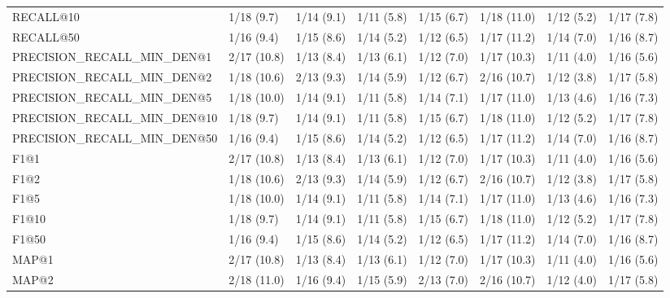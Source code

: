 \begin{tabular}{llllllll}
RECALL@10                   &      1/18 (9.7) &       1/14 (9.1) &  1/11 (5.8) &  1/15 (6.7) &  1/18 (11.0) &     1/12 (5.2) &            1/17 (7.8) \\
RECALL@50                   &      1/16 (9.4) &       1/15 (8.6) &  1/14 (5.2) &  1/12 (6.5) &  1/17 (11.2) &     1/14 (7.0) &            1/16 (8.7) \\
PRECISION_RECALL_MIN_DEN@1  &     2/17 (10.8) &       1/13 (8.4) &  1/13 (6.1) &  1/12 (7.0) &  1/17 (10.3) &     1/11 (4.0) &            1/16 (5.6) \\
PRECISION_RECALL_MIN_DEN@2  &     1/18 (10.6) &       2/13 (9.3) &  1/14 (5.9) &  1/12 (6.7) &  2/16 (10.7) &     1/12 (3.8) &            1/17 (5.8) \\
PRECISION_RECALL_MIN_DEN@5  &     1/18 (10.0) &       1/14 (9.1) &  1/11 (5.8) &  1/14 (7.1) &  1/17 (11.0) &     1/13 (4.6) &            1/16 (7.3) \\
PRECISION_RECALL_MIN_DEN@10 &      1/18 (9.7) &       1/14 (9.1) &  1/11 (5.8) &  1/15 (6.7) &  1/18 (11.0) &     1/12 (5.2) &            1/17 (7.8) \\
PRECISION_RECALL_MIN_DEN@50 &      1/16 (9.4) &       1/15 (8.6) &  1/14 (5.2) &  1/12 (6.5) &  1/17 (11.2) &     1/14 (7.0) &            1/16 (8.7) \\
F1@1                        &     2/17 (10.8) &       1/13 (8.4) &  1/13 (6.1) &  1/12 (7.0) &  1/17 (10.3) &     1/11 (4.0) &            1/16 (5.6) \\
F1@2                        &     1/18 (10.6) &       2/13 (9.3) &  1/14 (5.9) &  1/12 (6.7) &  2/16 (10.7) &     1/12 (3.8) &            1/17 (5.8) \\
F1@5                        &     1/18 (10.0) &       1/14 (9.1) &  1/11 (5.8) &  1/14 (7.1) &  1/17 (11.0) &     1/13 (4.6) &            1/16 (7.3) \\
F1@10                       &      1/18 (9.7) &       1/14 (9.1) &  1/11 (5.8) &  1/15 (6.7) &  1/18 (11.0) &     1/12 (5.2) &            1/17 (7.8) \\
F1@50                       &      1/16 (9.4) &       1/15 (8.6) &  1/14 (5.2) &  1/12 (6.5) &  1/17 (11.2) &     1/14 (7.0) &            1/16 (8.7) \\
MAP@1                       &     2/17 (10.8) &       1/13 (8.4) &  1/13 (6.1) &  1/12 (7.0) &  1/17 (10.3) &     1/11 (4.0) &            1/16 (5.6) \\
MAP@2                       &     2/18 (11.0) &       1/16 (9.4) &  1/15 (5.9) &  2/13 (7.0) &  2/16 (10.7) &     1/12 (4.0) &            1/17 (5.8) \\

\end{tabular}
